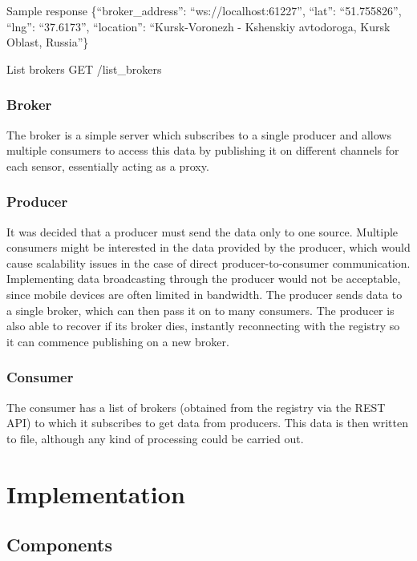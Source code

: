 Sample response \{``broker\_address'': ``ws://localhost:61227'',
``lat'': ``51.755826'', ``lng'': ``37.6173'', ``location'':
``Kursk-Voronezh - Kshenskiy avtodoroga, Kursk Oblast, Russia''\}

List brokers GET /list\_brokers

\subsubsection{Broker}\label{broker}

The broker is a simple server which subscribes to a single producer and
allows multiple consumers to access this data by publishing it on
different channels for each sensor, essentially acting as a proxy.

\subsubsection{Producer}\label{producer}

It was decided that a producer must send the data only to one source.
Multiple consumers might be interested in the data provided by the
producer, which would cause scalability issues in the case of direct
producer-to-consumer communication. Implementing data broadcasting
through the producer would not be acceptable, since mobile devices are
often limited in bandwidth. The producer sends data to a single broker,
which can then pass it on to many consumers. The producer is also able
to recover if its broker dies, instantly reconnecting with the registry
so it can commence publishing on a new broker.

\subsubsection{Consumer}\label{consumer}

The consumer has a list of brokers (obtained from the registry via the
REST API) to which it subscribes to get data from producers. This data
is then written to file, although any kind of processing could be
carried out.

\section{Implementation}\label{implementation}

\subsection{Components}\label{components-1}

